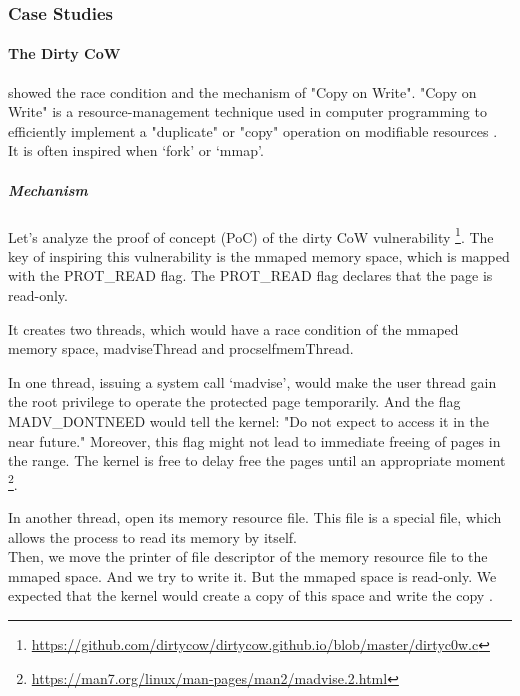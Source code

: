 \subsubsection{Case Studies}
\label{k_case}

\paragraph{The Dirty CoW}
\textcite{8019988} showed the race condition and the mechanism of "Copy on
Write". "Copy on Write" is a resource-management technique used in computer programming
to efficiently implement a "duplicate" or "copy" operation on modifiable resources \cite{6394426}.
It is often inspired when `fork' or `mmap'.

\subparagraph{Mechanism}
Let's analyze the proof of concept (PoC) of the dirty CoW \cite{8019988} vulnerability
\footnote{\url{https://github.com/dirtycow/dirtycow.github.io/blob/master/dirtyc0w.c}}.
The key of inspiring this vulnerability is the mmaped memory space, which is mapped with
the PROT\_READ flag. The PROT\_READ flag declares that the page is read-only.


It creates two threads, which would have a race condition of the mmaped memory space,
madviseThread and procselfmemThread.



In one thread, issuing a system call `madvise', would make the user thread gain the root
privilege to operate the protected page temporarily. And the flag MADV\_DONTNEED would
tell the kernel: "Do not expect to access it in the near future." Moreover,
this flag might not lead to immediate freeing of pages in the range. The kernel is free
to delay free the pages until an appropriate moment \footnote{\url{https://man7.org/linux/man-pages/man2/madvise.2.html}}.



In another thread, open its memory resource file. This file is a special file, which allows
the process to read its memory by itself.\\

Then, we move the printer of file descriptor of the memory resource file to the mmaped
space. And we try to write it. But the mmaped space is read-only. We expected that the
kernel would create a copy of this space and write the copy \cite{8001953}.\\


